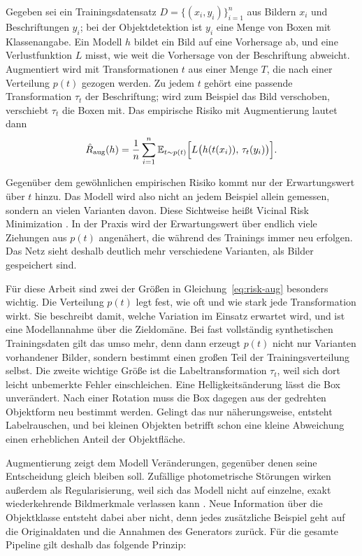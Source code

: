 Gegeben sei ein Trainingsdatensatz $D=\{(x_i,y_i)\}_{i=1}^{n}$ aus Bildern $x_i$
und Beschriftungen $y_i$; bei der Objektdetektion ist $y_i$ eine Menge von Boxen
mit Klassenangabe. Ein Modell $h$ bildet ein Bild auf eine Vorhersage ab, und
eine Verlustfunktion $L$ misst, wie weit die Vorhersage von der Beschriftung
abweicht. Augmentiert wird mit Transformationen $t$ aus einer Menge $T$, die
nach einer Verteilung $p(t)$ gezogen werden. Zu jedem $t$ gehört eine passende
Transformation $\tau_t$ der Beschriftung; wird zum Beispiel das Bild verschoben,
verschiebt $\tau_t$ die Boxen mit. Das empirische Risiko mit Augmentierung
lautet dann
\begin{equation}
  \hat R_{\mathrm{aug}}(h)
  =
  \frac{1}{n}\sum_{i=1}^{n}
  \mathbb{E}_{t\sim p(t)}
  \Bigl[
    L\bigl(h(t(x_i)),\,\tau_t(y_i)\bigr)
  \Bigr].
  \label{eq:risk-aug}
\end{equation}

Gegenüber dem gewöhnlichen empirischen Risiko kommt nur der Erwartungswert über
$t$ hinzu. Das Modell wird also nicht an jedem Beispiel allein gemessen, sondern
an vielen Varianten davon. Diese Sichtweise heißt Vicinal Risk Minimization
\parencite{chapelle2001}. In der Praxis wird der Erwartungswert über endlich
viele Ziehungen aus $p(t)$ angenähert, die während des Trainings immer neu
erfolgen. Das Netz sieht deshalb deutlich mehr verschiedene Varianten, als
Bilder gespeichert sind.

Für diese Arbeit sind zwei der Größen in Gleichung~\eqref{eq:risk-aug}
besonders wichtig. Die Verteilung $p(t)$ legt fest, wie oft und wie stark jede
Transformation wirkt. Sie beschreibt damit, welche Variation im Einsatz erwartet
wird, und ist eine Modellannahme über die Zieldomäne. Bei fast vollständig
synthetischen Trainingsdaten gilt das umso mehr, denn dann erzeugt $p(t)$ nicht
nur Varianten vorhandener Bilder, sondern bestimmt einen großen Teil der
Trainingsverteilung selbst. Die zweite wichtige Größe ist die
Labeltransformation $\tau_t$, weil sich dort leicht unbemerkte Fehler
einschleichen. Eine Helligkeitsänderung lässt die Box unverändert. Nach einer
Rotation muss die Box dagegen aus der gedrehten Objektform neu bestimmt werden.
Gelingt das nur näherungsweise, entsteht Labelrauschen, und bei kleinen
Objekten betrifft schon eine kleine Abweichung einen erheblichen Anteil der
Objektfläche.

 Augmentierung zeigt dem Modell
Veränderungen, gegenüber denen seine Entscheidung gleich bleiben soll. Zufällige
photometrische Störungen wirken außerdem als Regularisierung, weil sich das
Modell nicht auf einzelne, exakt wiederkehrende Bildmerkmale verlassen kann
\parencite{bishop1995}. Neue Information über die Objektklasse entsteht dabei
aber nicht, denn jedes zusätzliche Beispiel geht auf die Originaldaten und die
Annahmen des Generators zurück. Für die gesamte Pipeline gilt deshalb das
folgende Prinzip:

